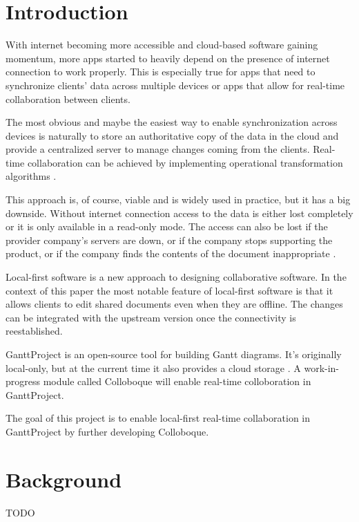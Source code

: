 \documentclass[a4paper, 11pt, oneside]{article}
\theoremstyle{definition}
\begin{document}
\newpage
\tableofcontents

\clearpage
{}

\section{Introduction}

With internet becoming more accessible and cloud-based software gaining momentum, more apps started to heavily depend on the presence of internet connection to work properly. This is especially true for apps that need to synchronize clients' data across multiple devices or apps that allow for real-time collaboration between clients.

The most obvious and maybe the easiest way to enable synchronization across devices is naturally to store an authoritative copy of the data in the cloud and provide a centralized server to manage changes coming from the clients. Real-time collaboration can be achieved by implementing operational transformation algorithms \cite{operational}.

This approach is, of course, viable and is widely used in practice, but it has a big downside. Without internet connection access to the data is either lost completely or it is only available in a read-only mode. The access can also be lost if the provider company's servers are down, or if the company stops supporting the product, or if the company finds the contents of the document inappropriate \cite{googleblock}. 

Local-first software \cite{localfirst} is a new approach to designing collaborative software. In the context of this paper the most notable feature of local-first software is that it allows clients to edit shared documents even when they are offline. The changes can be integrated with the upstream version once the connectivity is reestablished.

GanttProject \cite{ganttsite,ganttrepo} is an open-source tool for building Gantt diagrams. It's originally local-only, but at the current time it also provides a cloud storage \cite{ganttcloudsite}. A work-in-progress module called Colloboque will enable real-time colloboration in GanttProject.

The goal of this project is to enable local-first real-time collaboration in GanttProject by further developing Colloboque.

\section{Background}
TODO
\end{document}
